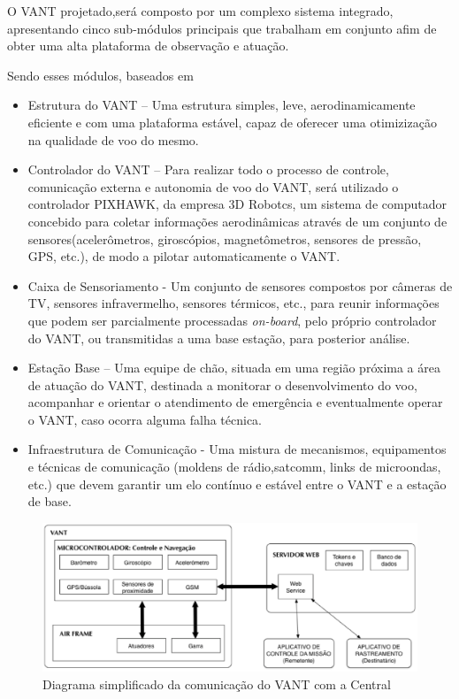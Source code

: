 O VANT projetado,será composto por um complexo sistema integrado, apresentando cinco sub-módulos principais  que trabalham em conjunto afim de obter uma alta plataforma de observação e atuação.

Sendo esses módulos, baseados em \cite{pastor}

\begin{itemize}
	\item Estrutura do VANT – Uma estrutura simples, leve, aerodinamicamente eficiente e com uma plataforma estável, capaz de oferecer uma otimizização na qualidade de voo do mesmo. 
	\item Controlador do VANT – Para realizar todo o processo de controle, comunicação externa e autonomia de voo do VANT, será utilizado o controlador PIXHAWK, da empresa 3D Robotcs, um sistema de computador concebido para coletar informações aerodinâmicas através de um conjunto de sensores(acelerômetros, giroscópios, magnetômetros, sensores de pressão, GPS, etc.), de modo a pilotar automaticamente o VANT.
	\item Caixa de Sensoriamento - Um conjunto de sensores compostos por câmeras de TV, sensores infravermelho, sensores térmicos, etc., para reunir informações que podem ser parcialmente processadas \textit{on-board}, pelo próprio controlador do VANT, ou transmitidas a uma base estação, para posterior análise.
	\item Estação Base – Uma equipe de chão, situada em uma região próxima a área de atuação do VANT, destinada a monitorar o desenvolvimento do voo, acompanhar e orientar o atendimento de emergência e eventualmente operar o VANT, caso ocorra alguma falha técnica. 
	\item Infraestrutura de Comunicação - Uma mistura de mecanismos, equipamentos e técnicas de comunicação (moldens de rádio,satcomm, links de microondas, etc.) que devem garantir um elo contínuo e estável entre o VANT e a estação de base. 
\end{itemize}


\begin{figure}[H]
	\centering
	  \includegraphics[keepaspectratio=true,scale=0.7]{figuras/diagrama.eps}
	\caption{Diagrama simplificado da comunicação do VANT com a Central}
	\label{fig:diagrama}
\end{figure}

